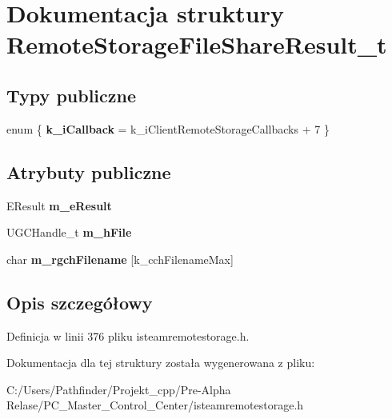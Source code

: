 \hypertarget{struct_remote_storage_file_share_result__t}{}\section{Dokumentacja struktury Remote\+Storage\+File\+Share\+Result\+\_\+t}
\label{struct_remote_storage_file_share_result__t}
\subsection*{Typy publiczne}
\begin{DoxyCompactItemize}
\item 
\mbox{\label{struct_remote_storage_file_share_result__t_a968b58cba174c12b8c3b2e15b8f92cee}} 
enum \{ {\bfseries k\+\_\+i\+Callback} = k\+\_\+i\+Client\+Remote\+Storage\+Callbacks + 7
 \}
\end{DoxyCompactItemize}
\subsection*{Atrybuty publiczne}
\begin{DoxyCompactItemize}
\item 
\mbox{\label{struct_remote_storage_file_share_result__t_a24ec60e265d70b4304eb4098f64e0c0d}} 
E\+Result {\bfseries m\+\_\+e\+Result}
\item 
\mbox{\label{struct_remote_storage_file_share_result__t_a465c5fa0eaa6bc8d61de4da74cff5c3b}} 
U\+G\+C\+Handle\+\_\+t {\bfseries m\+\_\+h\+File}
\item 
\mbox{\label{struct_remote_storage_file_share_result__t_a2793d40e3ae7db06de1ce2087ac5c7b7}} 
char {\bfseries m\+\_\+rgch\+Filename} \mbox{[}k\+\_\+cch\+Filename\+Max\mbox{]}
\end{DoxyCompactItemize}


\subsection{Opis szczegółowy}


Definicja w linii 376 pliku isteamremotestorage.\+h.



Dokumentacja dla tej struktury została wygenerowana z pliku\+:\begin{DoxyCompactItemize}
\item 
C\+:/\+Users/\+Pathfinder/\+Projekt\+\_\+cpp/\+Pre-\/\+Alpha Relase/\+P\+C\+\_\+\+Master\+\_\+\+Control\+\_\+\+Center/isteamremotestorage.\+h\end{DoxyCompactItemize}
